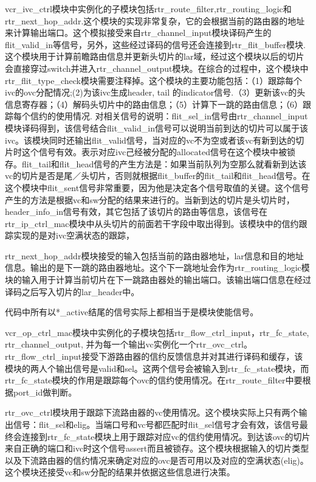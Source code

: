 ﻿\documentclass[10pt,journal]{IEEEtran}
\begin{document}
vcr\_ivc\_ctrl模块中实例化的子模块包括rtr\_route\_filter,rtr\_routing\_logic和rtr\_next\_hop\_addr.这个模块的实现非常复杂，它的会根据当前的路由器的地址来计算输出端口。这个模拟接受来自rtr\_channel\_input模块译码产生的flit\_valid\_in等信号，另外，这些经过译码的信号还会连接到rtr\_flit\_buffer模块.这个模块用于计算前瞻路由信息并更新头切片的lar域，经过这个模块以后的切片会直接穿过switch并进入rtr\_channel\_output模块。在综合的过程中，这个模块中rtr\_flit\_type\_check模块需要注释掉。这个模块的主要功能包括：（1）跟踪每个ivc的ovc分配情况;(2)为该ivc生成header, tail 的indicator信号.（3）更新该vc的头信息寄存器；（4）解码头切片中的路由信息；（5）计算下一跳的路由信息；（6）跟踪每个信约的使用情况. 对相关信号的说明：flit\_sel\_in信号由rtr\_channel\_input模块译码得到，该信号结合flit\_valid\_in信号可以说明当前到达的切片可以属于该ivc。该模块同时还输出flit\_valid信号，当对应的vc不为空或者该vc有新到达的切片时这个信号有效。表示对应ivc己经被分配的allocated信号在这个模块中被锁存。flit\_tail和flit\_head信号的产生方法是：如果当前队列为空那么就看新到达该vc的切片是否是尾／头切片，否则就根据flit\_buffer的flit\_tail和flit\_head信号。在这个模块中flit\_sent信号非常重要，因为他是决定各个信号取值的关键。这个信号产生的方法是根据vc和sw分配的结果来进行的。当新到达的切片是头切片时，header\_info\_in信号有效，其它包括了该切片的路由等信息，该信号在rtr\_ip\_ctrl\_mac模块中从头切片的前面若干字段中取出得到。该模块中的信约跟踪实现的是对ivc空满状态的跟踪，

rtr\_next\_hop\_addr模块接受的输入包括当前的路由器地址，lar信息和目的地址信息。输出的是下一跳的路由器地址。这个下一跳地址会作为rtr\_routing\_logic模块的输入用于计算当前切片在下一跳路由器处的输出端口。该输出端口信息在经过译码之后写入切片的lar\_header中。

代码中所有以*\_active结尾的信号实际上都相当于是模块使能信号。

vcr\_op\_ctrl\_mac模块中实例化的子模块包括rtr\_flow\_ctrl\_input，rtr\_fc\_state, rtr\_channel\_output, 并为每一个输出vc实例化一个rtr\_ovc\_ctrl。rtr\_flow\_ctrl\_input接受下游路由器的信约反馈信息并对其进行译码和缓存，该模块的两人个输出信号是valid和sel。这两个信号会被输入到rtr\_fc\_state模块，而rtr\_fc\_state模块的作用是跟踪每个ovc的信约使用情况。在rtr\_route\_filter中要根据port\_id做判断。

rtr\_ovc\_ctrl模块用于跟踪下流路由器的vc使用情况。这个模块实际上只有两个输出信号：flit\_sel和elig。当端口号和vc号都匹配时flit\_sel信号才会有效，该信号最终会连接到rtr\_fc\_state模块上用于跟踪对应vc的信约使用情况。到达该ovc的切片来自正确的端口和ivc时这个信号assert而且被锁存。这个模块根据输入的切片类型以及下流路由器的信约情况来确定对应的ovc是否可用以及对应的空满状态(elig)。这个模块还接受vc和sw分配的结果并依据这些信息进行决策。
\end{document}
